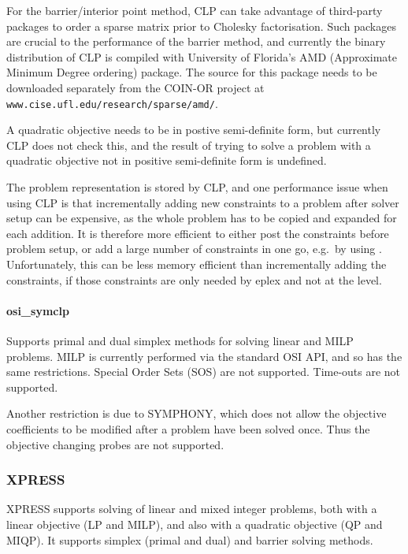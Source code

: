 For the barrier/interior point method, CLP can take advantage of
third-party packages to order a sparse matrix prior to Cholesky
factorisation. Such packages are crucial to the performance of the
barrier method, and currently the binary distribution of CLP is compiled
with University of Florida's AMD (Approximate Minimum Degree ordering) 
package. The source for this package needs to be downloaded separately from
the COIN-OR project at {\tt www.cise.ufl.edu/research/sparse/amd/}. 

A quadratic objective needs to be in postive semi-definite form, but
currently CLP does not check this, and the result of trying to solve a
problem with a quadratic objective not in positive semi-definite form
is undefined.

The problem representation is stored by CLP, and one performance issue 
when using CLP is that incrementally adding new constraints to
a problem after solver setup can be expensive, as the whole problem has to
be copied and expanded for each addition. It is therefore more efficient to 
either post the constraints before problem setup, or add a large number of
constraints in one go, e.g.\ by using 
.
Unfortunately, this can be less memory efficient than incrementally adding
the constraints, if those constraints are only needed by eplex and not at
the {\eclipse} level.

\paragraph{osi_symclp} Supports primal and dual simplex methods for
solving linear and MILP problems. MILP is currently performed via the 
standard OSI API, and so has the same restrictions. Special Order Sets
(SOS) are not supported. Time-outs are not supported.
 
Another restriction is due to SYMPHONY, which does not allow the objective
coefficients to be modified after a problem have been solved once. Thus the
objective changing probes are not supported.

\subsubsection{XPRESS}
XPRESS supports solving of linear and mixed integer problems, both with a
linear objective (LP and MILP), and also with a quadratic objective (QP and
MIQP). It supports simplex (primal and dual) and barrier solving methods.


